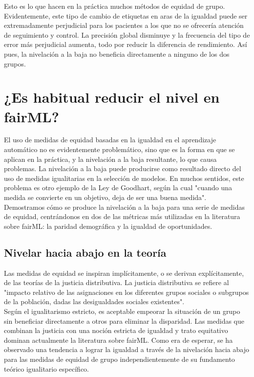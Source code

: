 Esto es lo que hacen en la práctica muchos métodos de equidad de grupo. Evidentemente, este tipo de cambio de etiquetas en aras de la igualdad puede ser extremadamente perjudicial para los pacientes a los que no se ofrecería atención de seguimiento y control. La precisión global disminuye y la frecuencia del tipo de error más perjudicial aumenta, todo por reducir la diferencia de rendimiento. Así pues, la nivelación a la baja no beneficia directamente a ninguno de los dos grupos. 

\section{¿Es habitual reducir el nivel en fairML?}
El uso de medidas de equidad basadas en la igualdad en el aprendizaje automático no es evidentemente problemático, sino que es la forma en que se aplican en la práctica, y la nivelación a la baja resultante, lo que causa problemas. La nivelación a la baja puede producirse como resultado directo del uso de medidas igualitarias en la selección de modelos. En muchos sentidos, este problema es otro ejemplo de la Ley de Goodhart, según la cual "cuando una medida se convierte en un objetivo, deja de ser una buena medida".\\

Demostramos cómo se produce la nivelación a la baja para una serie de medidas de equidad, centrándonos en dos de las métricas más utilizadas en la literatura sobre fairML: la paridad demográfica y la igualdad de oportunidades.


\subsection{Nivelar hacia abajo en la teoría}
Las medidas de equidad se inspiran implícitamente, o se derivan explícitamente, de las teorías de la justicia distributiva. La justicia distributiva se refiere al "impacto relativo de las asignaciones en los diferentes grupos sociales o subgrupos de la población, dadas las desigualdades sociales existentes".\\

Según el igualitarismo estricto, es aceptable empeorar la situación de un grupo sin beneficiar directamente a otros para eliminar la disparidad.  Las medidas que combinan la justicia con una noción estricta de igualdad y trato equitativo dominan actualmente la literatura sobre fairML.  Como era de esperar, se ha observado una tendencia a lograr la igualdad a través de la nivelación hacia abajo para las medidas de equidad de grupo independientemente de su fundamento teórico igualitario específico. \\

